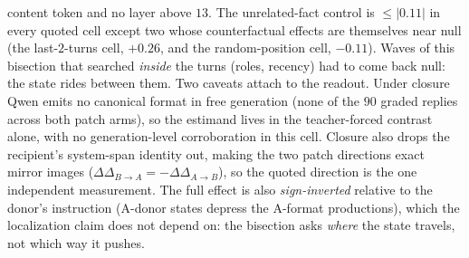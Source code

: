\documentclass{article}
\begin{document}
content token and no layer above $13$. The unrelated-fact control is $\le|0.11|$ in
every quoted cell except two whose counterfactual effects are themselves near null (the
last-$2$-turns cell, $+0.26$, and the random-position cell, $-0.11$). Waves of this bisection
that searched \emph{inside} the turns (roles,
recency) had to come back null: the state rides between them. Two caveats attach to the
readout. Under closure Qwen emits no canonical format in free generation (none of the $90$
graded replies across both patch arms), so the estimand lives in the teacher-forced contrast
alone, with no
generation-level corroboration in this cell. Closure also drops the recipient's system-span
identity out, making the two patch directions exact mirror images
($\Delta\Delta_{B\to A}=-\Delta\Delta_{A\to B}$), so the quoted direction is the one
independent measurement. The full effect is also \emph{sign-inverted} relative to the donor's
instruction (A-donor states depress the A-format productions), which the localization claim
does not depend on: the bisection asks \emph{where} the state travels, not which way it
pushes.
\end{document}
